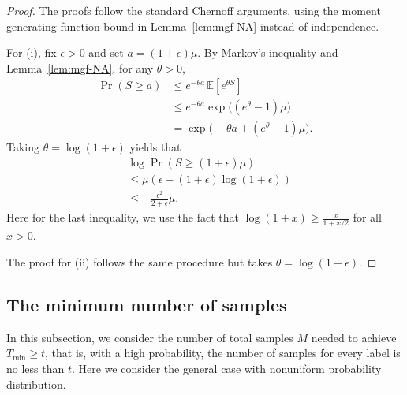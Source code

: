 \documentclass[aps,prx,reprint,superscriptaddress,amsmath,amssymb,longbibliography,floatfix]{revtex4-2}
\newcommand{\dsE}{\mathbb{E}}
\theoremstyle{plain}
\theoremstyle{definition}
\theoremstyle{remark}
\begin{document}
\begin{proof}
The proofs follow the standard Chernoff arguments, using the moment generating function bound in Lemma~\ref{lem:mgf-NA} instead of independence.

For (i), fix \(\epsilon>0\) and set \(a = (1+\epsilon)\mu\).
By Markov's inequality and Lemma~\ref{lem:mgf-NA},
for any \(\theta>0\),
\begin{align*}
\Pr(S \geq a)
  &\le e^{-\theta a}\,\dsE [e^{\theta S}]\\
  &\le e^{-\theta a} \exp\big( (e^{\theta}-1)\mu \big)\\
  &= \exp\big( -\theta a + (e^{\theta}-1)\mu \big).
\end{align*}
Taking $\theta = \log ( 1 + \epsilon )$ yields that 
\begin{align*}
&\log \Pr(S \geq (1+\epsilon)\mu )
   \\
  &\leq \mu(\epsilon - (1+\epsilon) \log(1+\epsilon) ) \\
  &\leq -\frac{\epsilon^2}{ 2 + \epsilon }\mu.
\end{align*}
Here for the last inequality, we use the fact that $\log( 1+x ) \geq \frac{ x }{ 1 + x/2}$ for all $x>0$.

The proof for (ii) follows the same procedure but takes $\theta = \log(1-\epsilon)$.
\end{proof}

\subsection{The minimum number of samples}\label{appsub: minM to reach T}
In this subsection, we consider the number of total samples $M$ needed to achieve $T_{\min} \ge t$, that is, with a high probability, the number of samples for every label is no less than $t$. Here we consider the general case with nonuniform probability distribution.
\end{document}
